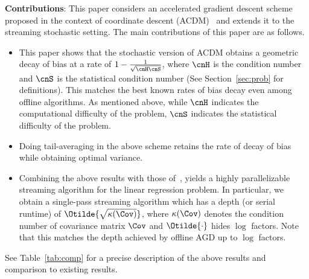 \textbf{Contributions}:
This paper considers an accelerated gradient descent scheme proposed in the context of coordinate descent (ACDM)~\cite{Nesterov12} and extends it to the streaming stochastic setting. The main contributions of this paper are as follows.
\begin{itemize}
	\item	This paper shows that the stochastic version of ACDM obtains a geometric decay of bias at a rate of $1-\frac{1}{\sqrt{\cnH\cnS}}$, where $\cnH$ is the condition number and $\cnS$ is the statistical condition number (See Section~\ref{sec:prob} for definitions). This matches the best known rates of bias decay even among offline algorithms. As mentioned above, while $\cnH$ indicates the computational difficulty of the problem, $\cnS$ indicates the statistical difficulty of the problem. %
	\item	Doing tail-averaging in the above scheme retains the rate of decay of bias while obtaining optimal variance.
	\item	Combining the above results with those of~\cite{JainKKNS16}, yields a highly parallelizable streaming algorithm for the linear regression problem. In particular, we obtain a single-pass streaming algorithm which has a depth (or serial runtime) of $\Otilde{\sqrt{\kappa(\Cov)}}$, where $\kappa(\Cov)$ denotes the condition number of covariance matrix $\Cov$ and $\Otilde{\cdot}$ hides $\log$ factors. Note that this matches the depth achieved by offline AGD up to $\log$ factors.
\end{itemize}
See Table~\ref{tab:comp} for a precise description of the above results and comparison to existing results.
